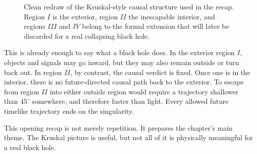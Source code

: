 \begin{figure}[htbp]
\centering
{}
\caption{Clean redraw of the Kruskal-style causal structure used in the recap. Region \(I\) is the exterior, region \(II\) the inescapable interior, and regions \(III\) and \(IV\) belong to the formal extension that will later be discarded for a real collapsing black hole.}
\end{figure}

This is already enough to say what a black hole does. In the exterior region \(I\), objects and signals may go inward, but they may also remain outside or turn back out. In region \(II\), by contrast, the causal verdict is fixed. Once one is in the interior, there is no future-directed causal path back to the exterior. To escape from region \(II\) into either outside region would require a trajectory shallower than \(45^\circ\) somewhere, and therefore faster than light. Every allowed future timelike trajectory ends on the singularity.

This opening recap is not merely repetition. It prepares the chapter's main theme. The Kruskal picture is useful, but not all of it is physically meaningful for a real black hole.

\begin{classroomqa}
\end{classroomqa}

